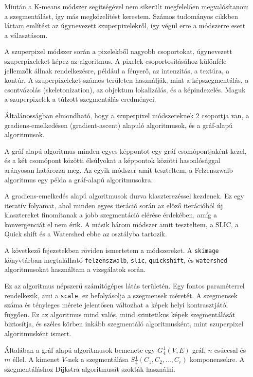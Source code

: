 
Miután a K-means módszer segítségével nem sikerült megfelelően megvalósítanom a szegmentálást, így más megközelítést kerestem. Számos tudományos cikkben láttam említést az úgynevezett szuperpixelekről, így végül erre a módszerre esett a választásom.

A szuperpixel módszer során a pixelekből nagyobb csoportokat, úgynevezett szuperpixeleket képez az algoritmus. A pixelek csoportosításához különféle jellemzők állnak rendelkezésre, például a fényerő, az intenzitás, a textúra, a kontúr. A szuperpixeleket számos területen használják, mint a képszegmentálás, a csontvázolás (skeletonization), az objektum lokalizálás, és a képindexelés. Maguk a szuperpixelek a túlzott szegmentálás eredményei.

Általánosságban elmondható, hogy a szuperpixel módszereknek 2 csoportja van, a gradiens-emelkedésen (gradient-ascent) alapuló algoritmusok, és a gráf-alapú algoritmusok.

A gráf-alapú algoritmus minden egyes képpontot egy gráf csomópontjaként kezel, és a két csomópont közötti élsúlyokat a képpontok közötti hasonlósággal arányosan határozza meg. Az egyik módszer amit teszteltem, a Felzenszwalb algoritmus egy példa a gráf-alapú algoritmusokra.

A gradiens-emelkedés alapú algoritmusok durva klaszterezéssel kezdenek. Ez egy iteratív folyamat, ahol minden egyes iteráció során az előző iterációból új klasztereket finomítanak a jobb szegmentáció elérése érdekében, amíg a konvergenciát el nem érik. A másik három módszer amit teszteltem, a SLIC, a Quick shift és a Watershed ebbe az osztályba tartozik. \cite{superpixel}

A következő fejezetekben röviden ismertetem a módszereket. A \texttt{skimage} könyvtárban megtalálható \texttt{felzenszwalb}, \texttt{slic}, \texttt{quickshift}, és \texttt{watershed} algoritmusokat használtam a vizsgálatok során.


Ez az algoritmus népszerű számítógépes látás területén. Egy fontos paraméterrel rendelkezik, ami a \texttt{scale}, ez befolyásolja a szegmensek méretét. A szegmensek száma és tényleges mérete jelentősen változhat a képek helyi kontrasztjától függően. Ez az algoritmus mind valós, mind szintetikus képek szegmentálását biztosítja, és széles körben inkább szegmentáló algoritmusként, mint szuperpixel algoritmusként ismert.

Általában a gráf alapú algoritmusok bemenete egy $G \frac{1}{4} (V, E)$ gráf, $n$ csúccsal és $m$ éllel. A kimenet $V$-nek a szegmentálása $S \frac{1}{4} (C_1, C_2, \dots, C_r)$ komponensekre. A szegmentáláshoz Dijkstra algoritmusát szokták használni.\cite{superpixel} \cite{superpixel_example}


